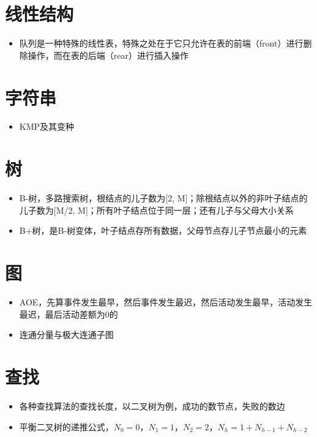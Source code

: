 \documentclass[UTF8]{ctexart}
\begin{document}
\section{线性结构}
\begin{itemize}
	\item 队列是一种特殊的线性表，特殊之处在于它只允许在表的前端（front）进行删除操作，而在表的后端（rear）进行插入操作
\end{itemize}

\section{字符串}
\begin{itemize}
	\item KMP及其变种
\end{itemize}

\section{树}
\begin{itemize}
	\item B-树，多路搜索树，根结点的儿子数为[2, M]；除根结点以外的非叶子结点的儿子数为[M/2, M]；所有叶子结点位于同一层；还有儿子与父母大小关系
	\item B+树，是B-树变体，叶子结点存所有数据，父母节点存儿子节点最小的元素
\end{itemize}

\section{图}
\begin{itemize}
	\item AOE，先算事件发生最早，然后事件发生最迟，然后活动发生最早，活动发生最迟，最后活动差额为0的
	\item 连通分量与极大连通子图
\end{itemize}


\section{查找}
\begin{itemize}
	\item 各种查找算法的查找长度，以二叉树为例，成功的数节点，失败的数边
	\item 平衡二叉树的递推公式，$N_0 = 0$，$N_1 = 1$，$N_2= 2$，$N_h = 1+N_{h-1}+N_{h-2}$
\end{itemize}
\end{document}
